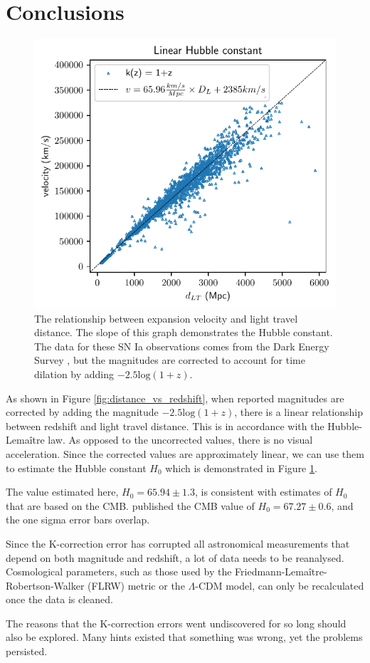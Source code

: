 \section{Conclusions}

\begin{figure}
  \includegraphics[width=\columnwidth]{velocity_vs_distance.pdf}
  \caption{The relationship between expansion velocity and light travel
  distance. The slope of this graph demonstrates the Hubble constant. The data
  for these SN Ia observations comes from the Dark Energy Survey
  \citep{vincenzi2024}, but the magnitudes are corrected to account for time
  dilation by adding ${-2.5 \text{log}(1 + z)}$.
  }
\label{fig:expansion}
\end{figure}

As shown in Figure \ref{fig:distance_vs_redshift}, when reported magnitudes
are corrected by adding the magnitude $-2.5\text{log}(1+z)$, there is a linear
relationship between redshift and light travel distance. This is in accordance
with the Hubble-Lema\^{i}tre law. As opposed to the uncorrected values, there
is no visual acceleration. Since the corrected values are approximately linear,
we can use them to estimate the Hubble constant $H_0$ which is demonstrated in
Figure \ref{fig:expansion}.

The value estimated here, $H_0 = 65.94 \pm 1.3$, is consistent with
estimates of $H_0$ that are based on the CMB. \citet{planck2020} published the
CMB value of $H_0 = 67.27 \pm 0.6$, and the one sigma error bars overlap.

Since the K-correction error has corrupted all astronomical measurements that
depend on both magnitude and redshift, a lot of data needs to be reanalysed.
Cosmological parameters, such as those used by the
Friedmann-Lema\^{i}tre-Robertson-Walker (FLRW) metric or the $\Lambda$-CDM
model, can only be recalculated once the data is cleaned.

The reasons that the K-correction errors went undiscovered for so long should
also be explored. Many hints existed that something was wrong, yet the
problems persisted.





